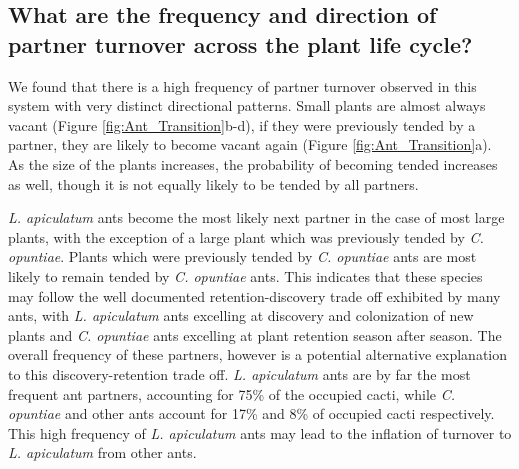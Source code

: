 \documentclass[11pt]{article}
\begin{document}
\subsection*{What are the frequency and direction of partner turnover across the plant life cycle?}
We found that there is a high frequency of partner turnover observed in this system with very distinct directional patterns. 
Small plants are almost always vacant (Figure \ref{fig:Ant_Transition}b-d), if they were previously tended by a partner, they are likely to become vacant again (Figure \ref{fig:Ant_Transition}a).
As the size of the plants increases, the probability of becoming tended increases as well, though it is not equally likely to be tended by all partners. 

\textit{L. apiculatum} ants become the most likely next partner in the case of most large plants, with the exception of a large plant which was previously tended by \textit{C. opuntiae}.
Plants which were previously tended by \textit{C. opuntiae} ants are most likely to remain tended by \textit{C. opuntiae} ants.
This indicates that these species may follow the well documented retention-discovery trade off exhibited  by many ants, with \textit{L. apiculatum} ants excelling at discovery and colonization of new plants and \textit{C. opuntiae} ants excelling at plant retention season after season.
The overall frequency of these partners, however is a potential alternative explanation to this discovery-retention trade off.
\textit{L. apiculatum} ants are by far the most frequent ant partners, accounting for 75\% of the occupied cacti, while \textit{C. opuntiae} and other ants account for 17\% and 8\% of occupied cacti respectively.
This high frequency of \textit{L. apiculatum} ants may lead to the inflation of turnover to \textit{L. apiculatum} from other ants. 
\end{document}
